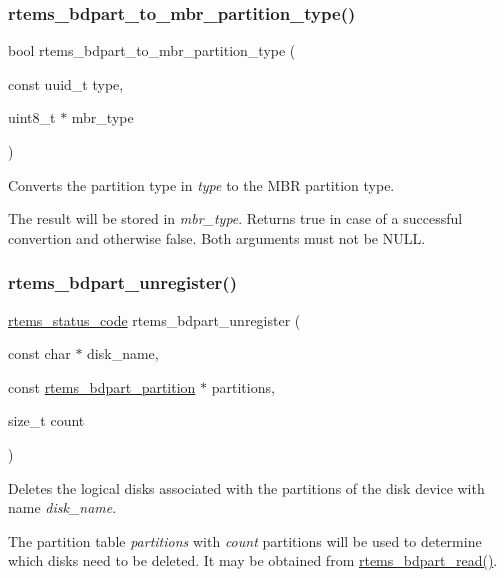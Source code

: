 \subsubsection{\texorpdfstring{rtems\_bdpart\_to\_mbr\_partition\_type()}{rtems\_bdpart\_to\_mbr\_partition\_type()}}
{\footnotesize\ttfamily bool rtems\+\_\+bdpart\+\_\+to\+\_\+mbr\+\_\+partition\+\_\+type (\begin{DoxyParamCaption}\item[{const uuid\+\_\+t}]{type,  }\item[{uint8\+\_\+t $\ast$}]{mbr\+\_\+type }\end{DoxyParamCaption})}



Converts the partition type in {\itshape type} to the M\+BR partition type. 

The result will be stored in {\itshape mbr\+\_\+type}. Returns {\ttfamily true} in case of a successful convertion and otherwise {\ttfamily false}. Both arguments must not be {\ttfamily N\+U\+LL}. \mbox{\label{group__rtems__bdpart_ga927be713792520f358b760d0e04fb5bf}} 
\subsubsection{\texorpdfstring{rtems\_bdpart\_unregister()}{rtems\_bdpart\_unregister()}}
{\footnotesize\ttfamily \mbox{\hyperlink{group__ClassicStatus_ga545d41846817eaba6143d52ee4d9e9fe}{rtems\+\_\+status\+\_\+code}} rtems\+\_\+bdpart\+\_\+unregister (\begin{DoxyParamCaption}\item[{const char $\ast$}]{disk\+\_\+name,  }\item[{const \mbox{\hyperlink{structrtems__bdpart__partition}{rtems\+\_\+bdpart\+\_\+partition}} $\ast$}]{partitions,  }\item[{size\+\_\+t}]{count }\end{DoxyParamCaption})}



Deletes the logical disks associated with the partitions of the disk device with name {\itshape disk\+\_\+name}. 

The partition table {\itshape partitions} with {\itshape count} partitions will be used to determine which disks need to be deleted. It may be obtained from \mbox{\hyperlink{group__rtems__bdpart_ga1ffdc1b7fc86d324faa9b93500ab0e63}{rtems\+\_\+bdpart\+\_\+read()}}. \mbox{\label{group__rtems__bdpart_gaa8b69004c352fe7867bdcb551453beb0}} 
